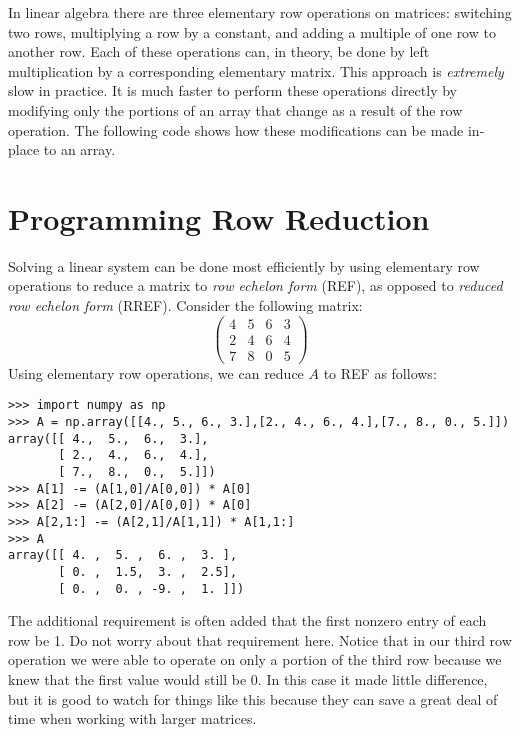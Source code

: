 \label{lab:LUdecomp}

In linear algebra there are three elementary row operations on matrices: switching two rows, multiplying a row by a constant, and adding a multiple of one row to another row.
Each of these operations can, in theory, be done by left multiplication by a corresponding elementary matrix.
This approach is \emph{extremely} slow in practice.
It is much faster to perform these operations directly by modifying only the portions of an array that change as a result of the row operation.
The following code shows how these modifications can be made in-place to an array.


\section*{Programming Row Reduction}
Solving a linear system can be done most efficiently by using elementary row operations to reduce a matrix to \emph{row echelon form} (REF), as opposed to \emph{reduced row echelon form} (RREF).
Consider the following matrix:
\[
\begin{pmatrix}
4&5&6&3 \\
2&4&6&4 \\
7&8&0&5
\end{pmatrix}
\]
Using elementary row operations, we can reduce $A$ to REF as follows:
\begin{lstlisting}
>>> import numpy as np
>>> A = np.array([[4., 5., 6., 3.],[2., 4., 6., 4.],[7., 8., 0., 5.]])
array([[ 4.,  5.,  6.,  3.],
       [ 2.,  4.,  6.,  4.],
       [ 7.,  8.,  0.,  5.]])
>>> A[1] -= (A[1,0]/A[0,0]) * A[0]
>>> A[2] -= (A[2,0]/A[0,0]) * A[0]
>>> A[2,1:] -= (A[2,1]/A[1,1]) * A[1,1:]
>>> A
array([[ 4. ,  5. ,  6. ,  3. ],
       [ 0. ,  1.5,  3. ,  2.5],
       [ 0. ,  0. , -9. ,  1. ]])
\end{lstlisting}
The additional requirement is often added that the first nonzero entry of each row be 1.
Do not worry about that requirement here.
Notice that in our third row operation we were able to operate on only a portion of the third row because we knew that the first value would still be 0.
In this case it made little difference, but it is good to watch for things like this because they can save a great deal of time when working with larger matrices.

